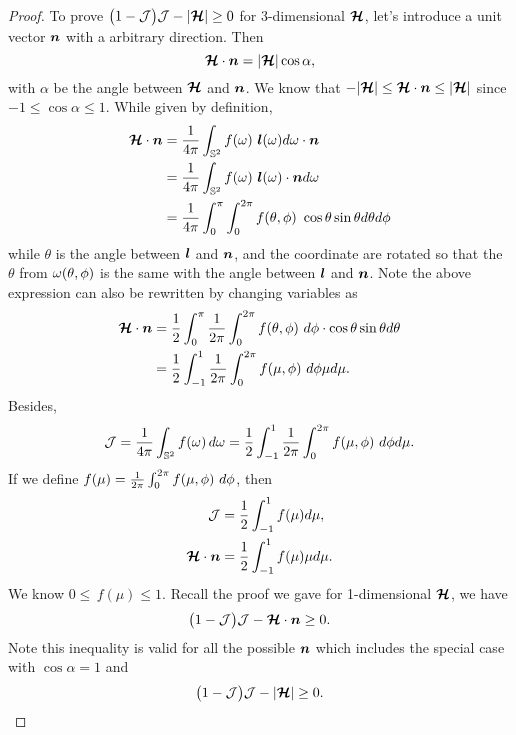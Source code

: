 \begin{proof}
    To prove $\big(1-\mathcal{J}\big)\mathcal{J}-|\boldsymbol{\mathcal{H}}|\ge0$ for 3-dimensional $\boldsymbol{\mathcal{H}}$, let's introduce a unit vector $\boldsymbol{n}$ with a arbitrary direction.
    Then 
    \begin{equation}
    \boldsymbol{\mathcal{H}} \cdot \boldsymbol{n} = |\boldsymbol{\mathcal{H}}| \cos\alpha,
    \end{equation}
    with $\alpha$ be the angle between $\boldsymbol{\mathcal{H}}$ and $\boldsymbol{n}$. 
    We know that $-|\boldsymbol{\mathcal{H}}|\leq\boldsymbol{\mathcal{H}} \cdot \boldsymbol{n}\leq|\boldsymbol{\mathcal{H}}|$ since $-1\leq\cos\alpha\leq1$.
    While given by definition,
    \begin{align}
    \vect{\cH} \cdot \bn & = \f{1}{4\pi}\int_{\bbS^{2}}f(\omegaNu)\ \bl(\omegaNu) d\omegaNu \cdot \bn \nonumber \\
     &= \f{1}{4\pi}\int_{\bbS^{2}}f(\omegaNu)\ \bl(\omegaNu) \cdot \bn d\omegaNu \nonumber \\
     &= \f{1}{4\pi}\int_{0}^{\pi}\int_{0}^{2\pi}f(\theta,\phi)\ \cos \theta \sin\theta d\theta d\phi
    \end{align}
    while $\theta$ is the angle between $\boldsymbol{l}$ and $\boldsymbol{n}$, and the coordinate are rotated so that the $\theta$ from $\omega(\theta,\phi)$ is the same with the angle between $\boldsymbol{l}$ and $\boldsymbol{n}$.
    Note the above expression can also be rewritten by changing variables as
    \begin{align}
    \boldsymbol{\mathcal{H}} \cdot \boldsymbol{n} & = \frac{1}{2}\int_{0}^{\pi} \frac{1}{2\pi}\int_{0}^{2\pi}f(\theta,\phi)\ d\phi \cdot \cos \theta \sin\theta d\theta  \\
    & =  \frac{1}{2}\int_{-1}^{1} \frac{1}{2\pi}\int_{0}^{2\pi}f(\mu,\phi)\ d\phi \mu d\mu.
    \end{align}
    Besides,
    \begin{align}
    \mathcal{J} = \frac{1}{4\pi}\int_{\mathbb{S}^{2}}f(\omega)\,d\omega = \frac{1}{2}\int_{-1}^{1} \frac{1}{2\pi}\int_{0}^{2\pi}f(\mu,\phi)\ d\phi d\mu.
    \end{align}
    If we define $f(\mu) =  \frac{1}{2\pi}\int_{0}^{2\pi}f(\mu,\phi)\ d\phi$, then
    \begin{align}
    \mathcal{J} &= \frac{1}{2}\int_{-1}^{1} f(\mu) d\mu, \\
    \boldsymbol{\mathcal{H}} \cdot \boldsymbol{n}  &= \frac{1}{2}\int_{-1}^{1} f(\mu) \mu d\mu.
    \end{align}
    We know $0\leq\,f(\mu)\leq1$.
    Recall the proof we gave for 1-dimensional $\boldsymbol{\mathcal{H}}$, we have
    \begin{equation}
     \big(1-\mathcal{J}\big)\mathcal{J}-\boldsymbol{\mathcal{H}} \cdot \boldsymbol{n}\ge0.
    \end{equation}
    Note this inequality is valid for all the possible $\boldsymbol{n}$ which includes the special case with $\cos\alpha=1$ and
    \begin{equation}
    \big(1-\mathcal{J}\big)\mathcal{J}-|\boldsymbol{\mathcal{H}}|\ge0.
    \end{equation} 
\end{proof}


